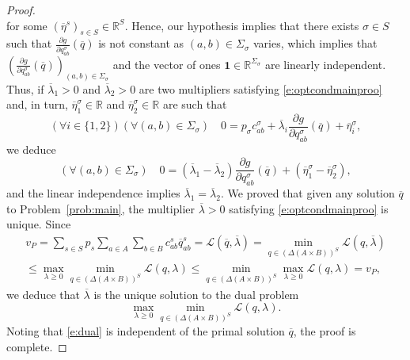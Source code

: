 \documentclass[smallextended,referee,envcountsect,]{svjour3}
\newcommand{\R}{{\mathbb R}}
\begin{document}
\begin{proof}
\begin{equation}
\end{equation}
for some $(\overline{\eta}^s)_{s\in S}\in \R^S$.
Hence, our hypothesis implies that there exists $\sigma\in 
S$ such that $\frac{\partial 
g}{\partial q_{ab}^{\sigma}}(\overline{q})$ is not constant 
as $(a, b) \in\Sigma_{\sigma}$ varies, 
which implies 
that 
$(\frac{\partial 
g}{\partial q_{ab}^{\sigma}}(\overline{q}))_{(a,b)\in\Sigma_{\sigma}}$
 and 
the 
vector of ones 
$\boldsymbol{1}\in \R^{\Sigma_{\sigma}}$ are linearly independent.
Thus, if $\overline{\lambda}_1>0$ and 
$\overline{\lambda}_2>0$
are two multipliers satisfying \eqref{e:optcondmainproo} and, in 
turn, $\overline{\eta}^{\sigma}_1\in\R$ and 
$\overline{\eta}^{\sigma}_2\in\R$ are such that 
\begin{equation}
\label{e:uniq2}
(\forall i\in\{1,2\})(\forall (a,b)\in\Sigma_{\sigma})\quad 
0=p_{\sigma}c_{ab}^{\sigma}+
\overline{\lambda}_i\frac{\partial 
g}{\partial q_{ab}^{\sigma}}(\overline{q})+\overline{\eta}^{\sigma}_i,
\end{equation}
we deduce 
\begin{equation}
\label{e:uniq3}
(\forall (a,b)\in\Sigma_{\sigma})\quad 
0=
(\overline{\lambda}_1-\overline{\lambda}_2)\frac{\partial 
g}{\partial q_{ab}^{\sigma}}
(\overline{q})+(\overline{\eta}^{\sigma}_1
-\overline{\eta}^{\sigma}_2),
\end{equation}
and the linear independence implies 
$\overline{\lambda}_1=\overline{\lambda}_2$. We proved that 
given any solution $\overline{q}$ to Problem~\ref{prob:main}, the 
multiplier $\overline{\lambda}>0$ satisfying 
\eqref{e:optcondmainproo} is unique. Since
\begin{multline}
v_P=\sum_{s\in S}p_s\sum_{a\in A}\sum_{b\in 
B}c_{ab}^s\overline{q}_{ab}^s
=\mathcal{L}(\overline{q},\overline{\lambda})=
\min_{q \in 
(\Delta(A\times 
B))^S}\mathcal{L} (q,\overline{\lambda})\\
\le 
\max_{\lambda\ge 0}\min_{q \in 
(\Delta(A\times 
B))^S}\mathcal{L} (q,\lambda)\le 
\min_{q \in 
(\Delta(A\times 
B))^S}\max_{\lambda\ge 0}\mathcal{L} (q,\lambda)=v_P,
\end{multline}
we deduce that $\overline{\lambda}$ is the unique solution to the 
dual 
problem
\begin{equation}
\label{e:dual}\tag{$D$}
\max_{\lambda\ge 0}\min_{q \in 
(\Delta(A\times 
B))^S}\mathcal{L} (q,\lambda).
\end{equation}
Noting that \eqref{e:dual} is independent of the primal solution 
$\overline{q}$, the proof is complete.




\end{proof}
\end{document}
